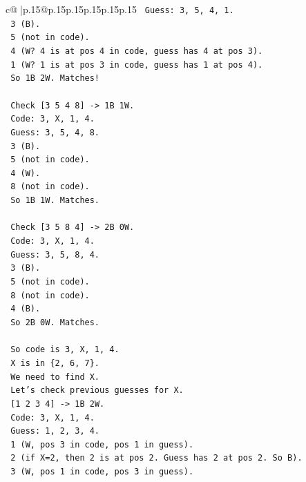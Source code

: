 \documentclass{article}
\begin{document}
{\begin{supertabular}{c@{$\;$}|p{.15\linewidth}@{}p{.15\linewidth}p{.15\linewidth}p{.15\linewidth}p{.15\linewidth}p{.15\linewidth}}
{{{\texttt{   Guess: 3, 5, 4, 1.} \\
\texttt{   3 (B).} \\
\texttt{   5 (not in code).} \\
\texttt{   4 (W? 4 is at pos 4 in code, guess has 4 at pos 3).} \\
\texttt{   1 (W? 1 is at pos 3 in code, guess has 1 at pos 4).} \\
\texttt{   So 1B 2W. Matches!} \\
\\ 
\texttt{   Check {[}3 5 4 8{]} {-}> 1B 1W.} \\
\texttt{   Code: 3, X, 1, 4.} \\
\texttt{   Guess: 3, 5, 4, 8.} \\
\texttt{   3 (B).} \\
\texttt{   5 (not in code).} \\
\texttt{   4 (W).} \\
\texttt{   8 (not in code).} \\
\texttt{   So 1B 1W. Matches.} \\
\\ 
\texttt{   Check {[}3 5 8 4{]} {-}> 2B 0W.} \\
\texttt{   Code: 3, X, 1, 4.} \\
\texttt{   Guess: 3, 5, 8, 4.} \\
\texttt{   3 (B).} \\
\texttt{   5 (not in code).} \\
\texttt{   8 (not in code).} \\
\texttt{   4 (B).} \\
\texttt{   So 2B 0W. Matches.} \\
\\ 
\texttt{   So code is 3, X, 1, 4.} \\
\texttt{   X is in \{2, 6, 7\}.} \\
\texttt{   We need to find X.} \\
\texttt{   Let's check previous guesses for X.} \\
\texttt{   {[}1 2 3 4{]} {-}> 1B 2W.} \\
\texttt{   Code: 3, X, 1, 4.} \\
\texttt{   Guess: 1, 2, 3, 4.} \\
\texttt{   1 (W, pos 3 in code, pos 1 in guess).} \\
\texttt{   2 (if X=2, then 2 is at pos 2. Guess has 2 at pos 2. So B).} \\
\texttt{   3 (W, pos 1 in code, pos 3 in guess).} \\
}}}
\end{supertabular}}
\end{document}
